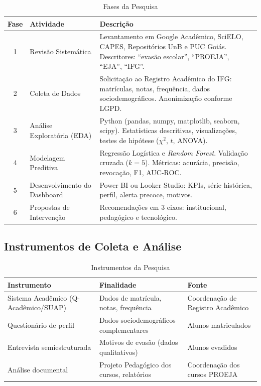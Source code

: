 \documentclass[12pt,a4paper]{article}
\begin{document}
\begin{table}[h!]
\centering
\caption{Fases da Pesquisa}
\label{tab:fases}
\begin{tabular}{c p{3cm} p{7cm}}
\toprule
\textbf{Fase} & \textbf{Atividade} & \textbf{Descrição} \\
\midrule
1 & Revisão Sistemática & Levantamento em Google Acadêmico, SciELO, CAPES, Repositórios UnB e PUC Goiás. Descritores: ``evasão escolar'', ``PROEJA'', ``EJA'', ``IFG''. \\
2 & Coleta de Dados & Solicitação ao Registro Acadêmico do IFG: matrículas, notas, frequência, dados sociodemográficos. Anonimização conforme LGPD. \\
3 & Análise Exploratória (EDA) & Python (pandas, numpy, matplotlib, seaborn, scipy). Estatísticas descritivas, visualizações, testes de hipótese ($\chi^2$, $t$, ANOVA). \\
4 & Modelagem Preditiva & Regressão Logística e \textit{Random Forest}. Validação cruzada ($k=5$). Métricas: acurácia, precisão, revocação, F1, AUC-ROC. \\
5 & Desenvolvimento do Dashboard & Power BI ou Looker Studio: KPIs, série histórica, perfil, alerta precoce, motivos. \\
6 & Propostas de Intervenção & Recomendações em 3 eixos: institucional, pedagógico e tecnológico. \\
\bottomrule
\end{tabular}
\end{table}

\subsection{Instrumentos de Coleta e Análise}

\begin{table}[h!]
\centering
\caption{Instrumentos da Pesquisa}
\label{tab:instrumentos}
\begin{tabular}{p{4cm} p{5.5cm} p{4.5cm}}
\toprule
\textbf{Instrumento} & \textbf{Finalidade} & \textbf{Fonte} \\
\midrule
Sistema Acadêmico (Q-Acadêmico/SUAP) & Dados de matrícula, notas, frequência & Coordenação de Registro Acadêmico \\
Questionário de perfil & Dados sociodemográficos complementares & Alunos matriculados \\
Entrevista semiestruturada & Motivos de evasão (dados qualitativos) & Alunos evadidos \\
Análise documental & Projeto Pedagógico dos cursos, relatórios & Coordenação dos cursos PROEJA \\
\bottomrule
\end{tabular}
\end{table}
\end{document}
